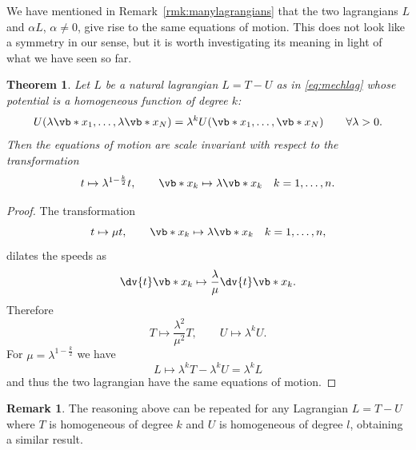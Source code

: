 \documentclass[english,fontsize=11pt,paper=b5]{scrbook}
\newtheorem{theorem}{Theorem}[chapter]
\theoremstyle{definition}
\newtheorem{remark}{Remark}[chapter]
\begin{document}
    We have mentioned in Remark~\ref{rmk:manylagrangians} that the two lagrangians $L$ and $\alpha L$, $\alpha\neq0$, give rise to the same equations of motion.
    This does not look like a symmetry in our sense, but it is worth investigating its meaning in light of what we have seen so far.

    \begin{theorem}
      Let $L$ be a natural lagrangian $L=T-U$ as in \eqref{eq:mechlag} whose potential is a homogeneous function of degree $k$:
      \begin{equation}
        U(\lambda\vb*{x}_1, \ldots, \lambda\vb*{x}_N) = \lambda^k U(\vb*{x}_1, \ldots, \vb*{x}_N)
        \qquad\forall \lambda>0.
      \end{equation}
      Then the equations of motion are scale invariant with respect to the transformation
      \begin{equation}
        t \mapsto \lambda^{1-\frac{k}2} t, \qquad
        \vb*{x}_k \mapsto \lambda\vb*{x}_k \quad k=1,\ldots,n.
      \end{equation}
    \end{theorem}
    \begin{proof}
      The transformation
      \begin{equation}
        t \mapsto \mu t, \qquad
        \vb*{x}_k \mapsto \lambda\vb*{x}_k \quad k=1,\ldots,n,
      \end{equation}
      dilates the speeds as
      \begin{equation}
        \dv{t} \vb*{x}_k \mapsto \frac{\lambda}{\mu} \dv{t}\vb*{x}_k.
      \end{equation}
      Therefore
      \begin{equation}
        T \mapsto \frac{\lambda^2}{\mu^2} T, \qquad U \mapsto \lambda^k U.
      \end{equation}
      For $\mu = \lambda^{1-\frac{k}2}$ we have
      \begin{equation}
        L \mapsto \lambda^k T - \lambda^k U = \lambda^k L
      \end{equation}
      and thus the two lagrangian have the same equations of motion.
    \end{proof}

    \begin{remark}
      The reasoning above can be repeated for any Lagrangian $L = T - U$ where $T$ is homogeneous of degree $k$ and $U$ is homogeneous of degree $l$, obtaining a similar result.
    \end{remark}
\end{document}
